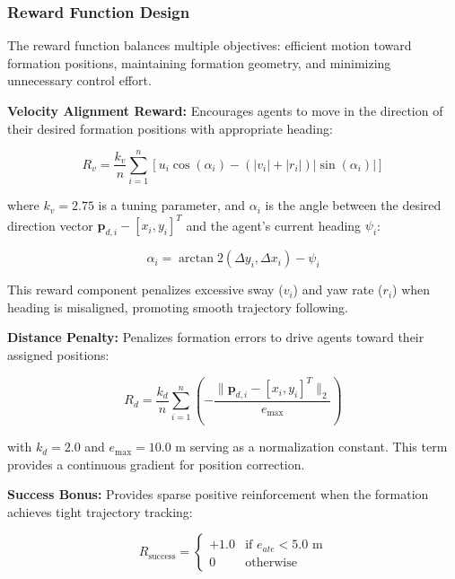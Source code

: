 \documentclass[preprint,3p]{elsarticle}
\begin{document}
\vspace{1em}

\subsubsection{Reward Function Design}
\label{subsec:reward}

The reward function balances multiple objectives: efficient motion toward formation positions, maintaining formation geometry, and minimizing unnecessary control effort.

\vspace{1em}

\textbf{Velocity Alignment Reward:} Encourages agents to move in the direction of their desired formation positions with appropriate heading:

\begin{equation}
    R_v = \frac{k_v}{n} \sum_{i=1}^n \left[ u_i \cos(\alpha_i) - (|v_i| + |r_i|) |\sin(\alpha_i)| \right]
\end{equation}

where $k_v = 2.75$ is a tuning parameter, and $\alpha_i$ is the angle between the desired direction vector $\mathbf{p}_{d,i} - [x_i, y_i]^T$ and the agent's current heading $\psi_i$:

\begin{equation}
    \alpha_i = \arctan2(\Delta y_i, \Delta x_i) - \psi_i
\end{equation}

This reward component penalizes excessive sway ($v_i$) and yaw rate ($r_i$) when heading is misaligned, promoting smooth trajectory following.

\vspace{1em}

\textbf{Distance Penalty:} Penalizes formation errors to drive agents toward their assigned positions:

\begin{equation}
    R_d = \frac{k_d}{n} \sum_{i=1}^n \left( -\frac{\|\mathbf{p}_{d,i} - [x_i, y_i]^T\|_2}{e_{\max}} \right)
\end{equation}

with $k_d = 2.0$ and $e_{\max} = 10.0$ m serving as a normalization constant. This term provides a continuous gradient for position correction.

\textbf{Success Bonus:} Provides sparse positive reinforcement when the formation achieves tight trajectory tracking:

\begin{equation}
    R_{\text{success}} = \begin{cases}
        +1.0 & \text{if } e_{ate} < 5.0 \text{ m} \\
        0 & \text{otherwise}
    \end{cases}
\end{equation}
\end{document}

